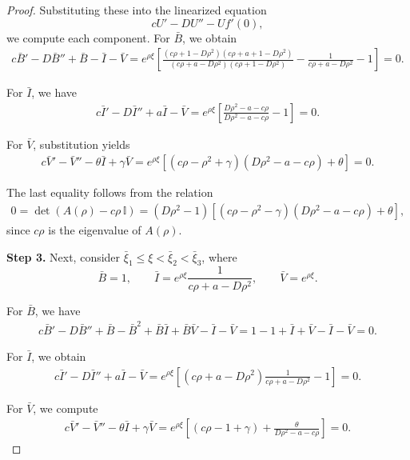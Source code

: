 \documentclass[11pt]{article}
\theoremstyle{definition}
\begin{document}
\begin{proof}
Substituting these into the linearized equation
\[
cU' - D U'' - U f'(0),
\]
we compute each component. For $\bar{B}$, we obtain
\begin{align}
c\bar{B}' - D\bar{B}'' + \bar{B} - \bar{I} - \bar{V}
= e^{\rho \xi}\left[
\frac{(c\rho +1- D\rho^{2})(c\rho+a+1-D\rho^2)}{(c\rho+a-D\rho^2)(c\rho+1-D\rho^2)}
-\frac{1}{c\rho+a-D\rho^2} - 1
\right]
=0.
\end{align}

For $\bar{I}$, we have
\begin{align}
c\bar{I}' - D\bar{I}'' + a\bar{I} - \bar{V}
= e^{\rho \xi}\left[
\frac{D\rho^{2}-a-c\rho}{D\rho^{2}-a-c\rho} - 1
\right]
=0.
\end{align}

For $\bar{V}$, substitution yields
\begin{align}
c\bar{V}' - \bar{V}'' - \theta \bar{I} + \gamma\bar{V}
= e^{\rho \xi}\left[
(c\rho - \rho^{2} + \gamma)(D\rho^{2}-a-c\rho) + \theta
\right]
=0.
\end{align}

The last equality follows from the relation  
\begin{align}\label{det_identitty_lemma_upper_proof}
0 = \det(A(\rho) - c\rho\,\mathbb{I})
     = (D\rho^{2}-1)\left[(c\rho - \rho^{2} - \gamma)(D\rho^{2}-a-c\rho) + \theta\right],
\end{align}
since $c\rho$ is the eigenvalue of $A(\rho)$.


\textbf{Step 3.} Next, consider $\bar{\xi}_1 \le \xi < \bar{\xi}_2 < \bar{\xi}_3$, where  
\[
\bar{B}=1, 
\qquad 
\bar{I}= e^{\rho \xi}\frac{1}{c\rho+a-D\rho^2},
\qquad 
\bar{V}= e^{\rho \xi}.
\]

For $\bar{B}$, we have
\begin{align}
c\bar{B}'-D\bar{B}''+\bar{B}-\bar{B}^{2}+\bar{B}\bar{I}+\bar{B}\bar{V}-\bar{I}-\bar{V}
= 1 - 1 + \bar{I} + \bar{V} - \bar{I} - \bar{V}
=0.
\end{align}

For $\bar{I}$, we obtain
\begin{align}
c\bar{I}' - D\bar{I}'' + a\bar{I} - \bar{V}
= e^{\rho \xi}\left[
(c\rho+a - D\rho^{2} )\frac{1}{c\rho+a-D\rho^2} - 1
\right]
=0.
\end{align}

For $\bar{V}$, we compute
\begin{align}
c\bar{V}' - \bar{V}'' - \theta \bar{I} + \gamma\bar{V}
= e^{\rho \xi}\left[
(c\rho - 1 + \gamma) + \frac{\theta}{D\rho^{2}-a-c\rho}
\right]
=0.
\end{align}


\end{proof}
\end{document}
